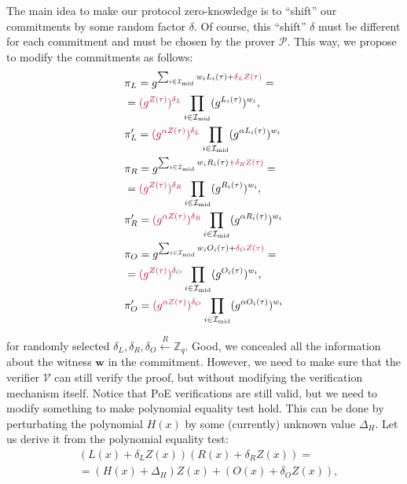 \documentclass[../lecture-notes.tex]{subfiles}
\begin{document}
The main idea to make our protocol zero-knowledge is to ``shift'' our commitments by some random factor $\delta$. Of course, this ``shift'' $\delta$ must be different for each commitment and must be chosen by the prover $\mathcal{P}$. This way, we propose to modify the commitments as follows:
\begin{equation*}    
    \begin{aligned}
        &\pi_L = g^{\sum_{i \in \mathcal{I}_{\text{mid}}}w_iL_i(\tau) + \textcolor{purple}{\delta_LZ(\tau)}} = \\ &= \textcolor{purple}{(g^{Z(\tau)})^{\delta_L}}\prod_{i \in \mathcal{I}_{\text{mid}}}(g^{L_i(\tau)})^{w_i}, \\ &\pi_L' = \textcolor{purple}{(g^{\alpha Z(\tau)})^{\delta_L}}\prod_{i \in \mathcal{I}_{\text{mid}}}(g^{\alpha L_i(\tau)})^{w_i} \\
        &\pi_R = g^{\sum_{i \in \mathcal{I}_{\text{mid}}}w_iR_i(\tau) + \textcolor{purple}{\delta_RZ(\tau)}} = \\ &= \textcolor{purple}{(g^{Z(\tau)})^{\delta_R}}\prod_{i \in \mathcal{I}_{\text{mid}}}(g^{R_i(\tau)})^{w_i}, \\ &\pi_R' = \textcolor{purple}{(g^{\alpha Z(\tau)})^{\delta_R}}\prod_{i \in \mathcal{I}_{\text{mid}}}(g^{\alpha R_i(\tau)})^{w_i} \\
        &\pi_O = g^{\sum_{i \in \mathcal{I}_{\text{mid}}}w_iO_i(\tau) + \textcolor{purple}{\delta_OZ(\tau)}} = \\ &= \textcolor{purple}{(g^{Z(\tau)})^{\delta_O}}\prod_{i \in \mathcal{I}_{\text{mid}}}(g^{O_i(\tau)})^{w_i}, \\ &\pi_O' = \textcolor{purple}{(g^{\alpha Z(\tau)})^{\delta_O}}\prod_{i \in \mathcal{I}_{\text{mid}}}(g^{\alpha O_i(\tau)})^{w_i}
    \end{aligned}
\end{equation*}

for randomly selected $\delta_L, \delta_R, \delta_O \xleftarrow{R} \mathbb{Z}_q$. Good, we concealed all the information about the witness $\mathbf{w}$ in the commitment. However, we need to make sure that the verifier $\mathcal{V}$ can still verify the proof, but without modifying the verification mechanism itself. Notice that PoE verifications are still valid, but we need to modify something to make polynomial equality test hold. This can be done by perturbating the polynomial $H(x)$ by some (currently) unknown value $\Delta_H$. Let us derive it from the polynomial equality test:
\begin{equation*}
    \begin{aligned}    
        &(L(x) + \delta_L Z(x))(R(x) + \delta_R Z(x)) = \\ &= (H(x) + \Delta_H)Z(x) + (O(x) + \delta_O Z(x)),
    \end{aligned}
\end{equation*}
\end{document}
